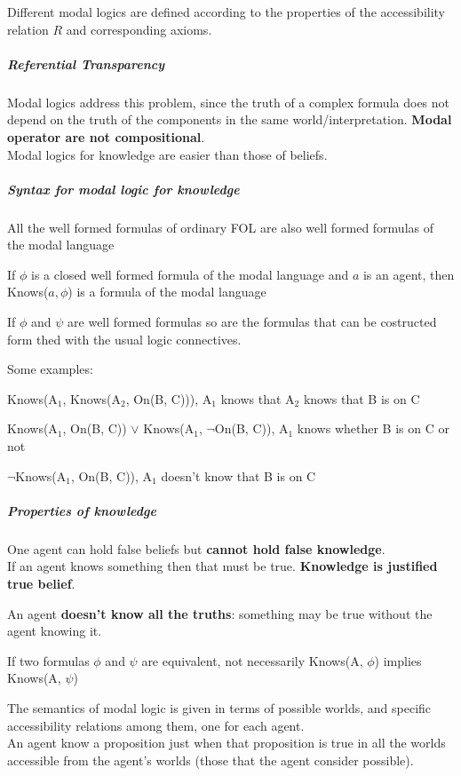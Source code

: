 \documentclass[10pt]{report}
\begin{document}
Different modal logics are defined according to the properties of the accessibility relation $R$ and corresponding axioms.
\subparagraph{Referential Transparency} Modal logics address this problem, since the truth of a complex formula does not depend on the truth of the components in the same world/interpretation. \textbf{Modal operator are not compositional}.\\
Modal logics for knowledge are easier than those of beliefs.
\subparagraph{Syntax for modal logic for knowledge} \begin{list}{}{}
	\item All the well formed formulas of ordinary FOL are also well formed formulas of the modal language
	\item If $\phi$ is a closed well formed formula of the modal language and $a$ is an agent, then Knows($a,\phi$) is a formula of the modal language
	\item If $\phi$ and $\psi$ are well formed formulas so are the formulas that can be costructed form thed with the usual logic connectives.
\end{list}
Some examples:
\begin{list}{}{}
	\item Knows(A$_1$, Knows(A$_2$, On(B, C))), A$_1$ knows that A$_2$ knows that B is on C
	\item Knows(A$_1$, On(B, C)) $\vee$ Knows(A$_1$, $\neg$On(B, C)), A$_1$ knows whether B is on C or not
	\item $\neg$Knows(A$_1$, On(B, C)), A$_1$ doesn't know that B is on C
\end{list}
\subparagraph{Properties of knowledge}\begin{list}{}{}
	\item One agent can hold false beliefs but \textbf{cannot hold false knowledge}.\\
	If an agent knows something then that must be true. \textbf{Knowledge is justified true belief}.
	\item An agent \textbf{doesn't know all the truths}: something may be true without the agent knowing it.
	\item If two formulas $\phi$ and $\psi$ are equivalent, not necessarily Knows(A, $\phi$) implies Knows(A, $\psi$)
\end{list}
The semantics of modal logic is given in terms of possible worlds, and specific accessibility relations among them, one for each agent.\\
An agent know a proposition just when that proposition is true in all the worlds accessible from the agent's worlds (those that the agent consider possible).\\
\end{document}
